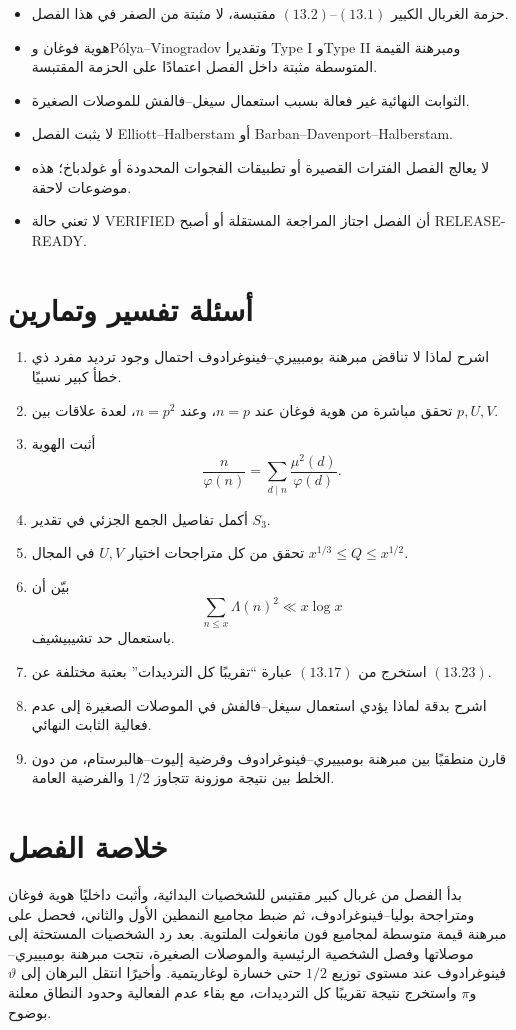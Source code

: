 \begin{itemize}
  \item حزمة الغربال الكبير \((13.1)\)--\((13.2)\) مقتبسة، لا مثبتة من
  الصفر في هذا الفصل.
  \item هوية فوغان وPólya--Vinogradov وتقديرا Type I وType II ومبرهنة
  القيمة المتوسطة مثبتة داخل الفصل اعتمادًا على الحزمة المقتبسة.
  \item الثوابت النهائية غير فعالة بسبب استعمال سيغل--فالفش للموصلات
  الصغيرة.
  \item لا يثبت الفصل Elliott--Halberstam أو Barban--Davenport--Halberstam.
  \item لا يعالج الفصل الفترات القصيرة أو تطبيقات الفجوات المحدودة أو
  غولدباخ؛ هذه موضوعات لاحقة.
  \item لا تعني حالة \textenglish{VERIFIED} أن الفصل اجتاز المراجعة المستقلة
  أو أصبح \textenglish{RELEASE-READY}.
\end{itemize}

\section{أسئلة تفسير وتمارين}

\begin{enumerate}
  \item اشرح لماذا لا تناقض مبرهنة بومبييري--فينوغرادوف احتمال وجود ترديد
  مفرد ذي خطأ كبير نسبيًا.
  \item تحقق مباشرة من هوية فوغان عند \(n=p\)، وعند \(n=p^2\)، لعدة علاقات
  بين \(p,U,V\).
  \item أثبت الهوية
  \[
  \frac n{\varphi(n)}
  =
  \sum_{d\mid n}\frac{\mu^2(d)}{\varphi(d)}.
  \]
  \item أكمل تفاصيل الجمع الجزئي في تقدير \(S_3\).
  \item تحقق من كل متراجحات اختيار \(U,V\) في المجال
  \(x^{1/3}\le Q\le x^{1/2}\).
  \item بيّن أن
  \[
  \sum_{n\le x}\Lambda(n)^2\ll x\log x
  \]
  باستعمال حد تشيبيشيف.
  \item استخرج من \((13.17)\) عبارة ``تقريبًا كل الترديدات'' بعتبة مختلفة
  عن \((13.23)\).
  \item اشرح بدقة لماذا يؤدي استعمال سيغل--فالفش في الموصلات الصغيرة إلى
  عدم فعالية الثابت النهائي.
  \item قارن منطقيًا بين مبرهنة بومبييري--فينوغرادوف وفرضية
  إليوت--هالبرستام، من دون الخلط بين نتيجة موزونة تتجاوز \(1/2\) والفرضية
  العامة.
\end{enumerate}

\section{خلاصة الفصل}

بدأ الفصل من غربال كبير مقتبس للشخصيات البدائية، وأثبت داخليًا هوية فوغان
ومتراجحة بوليا--فينوغرادوف، ثم ضبط مجاميع النمطين الأول والثاني، فحصل على
مبرهنة قيمة متوسطة لمجاميع فون مانغولت الملتوية. بعد رد الشخصيات المستحثة
إلى موصلاتها وفصل الشخصية الرئيسية والموصلات الصغيرة، نتجت مبرهنة
بومبييري--فينوغرادوف عند مستوى توزيع \(1/2\) حتى خسارة لوغاريتمية. وأخيرًا
انتقل البرهان إلى \(\vartheta\) و\(\pi\) واستخرج نتيجة تقريبًا كل
الترديدات، مع بقاء عدم الفعالية وحدود النطاق معلنة بوضوح.
